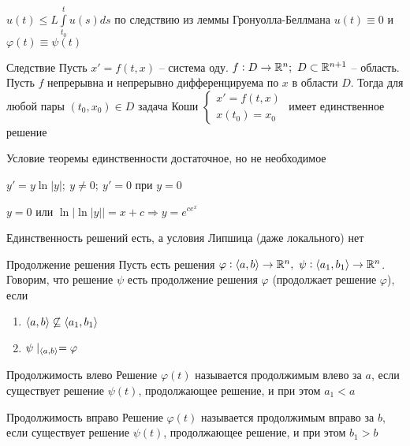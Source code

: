 \documentclass[12pt]{article}
\begin{document}
$u(t) \leq L\int\limits_{t_0}^t u(s) ds$ по следствию из леммы Гронуолла-Беллмана $u(t) \equiv 0$ и $\varphi(t) \equiv \psi(t)$

\begin{theo}{Следствие}
    Пусть $x' = f(t, x)$ -- система оду. $f : D \to \mathbb R^n;\ D \subset \mathbb R^{n + 1}$ -- область. Пусть $f$ непрерывна и непрерывно дифференцируема по $x$ в области $D$. Тогда для любой пары $(t_0, x_0) \in D$ задача Коши $\begin{cases}
        x' = f(t, x) \\
        x(t_0) = x_0
    \end{cases}$ имеет единственное решение
\end{theo}

\begin{Remark}{}
    Условие теоремы единственности достаточное, но не необходимое 

    $y' = y\ln|y|;\ y \neq 0;\ y' = 0$ при $y = 0$

    $y = 0$ или $\ln|\ln|y|| = x + c \Rightarrow y = e^{ce^x}$

    Единственность решений есть, а условия Липшица (даже локального) нет
\end{Remark}

\begin{defin}{Продолжение решения}
    Пусть есть решения $\varphi : \langle a, b \rangle \to \mathbb R^n,\ \psi : \langle a_1, b_1 \rangle \to \mathbb R^n$. Говорим, что решение $\psi$ есть продолжение решения $\varphi$ (продолжает решение $\varphi$), если 

    \begin{enumerate}
        \item $\langle a, b \rangle \not\subseteq \langle a_1, b_1 \rangle$
        \item $\psi\mid_{\langle a, b \rangle} = \varphi$
    \end{enumerate}
\end{defin}

\begin{defin}{Продолжимость влево}
    Решение $\varphi(t)$ называется продолжимым влево за $a$, если существует решение $\psi(t)$, продолжающее решение, и при этом $a_1 < a$
\end{defin}

\begin{defin}{Продолжимость вправо}
    Решение $\varphi(t)$ называется продолжимым вправо за $b$, если существует решение $\psi(t)$, продолжающее решение, и при этом $b_1 > b$
\end{defin}
\end{document}
